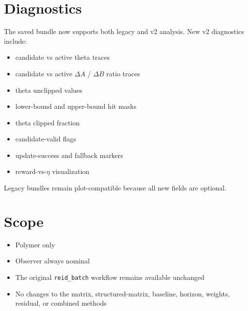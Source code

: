 \documentclass[11pt]{article}
\begin{document}
\section*{Diagnostics}

The saved bundle now supports both legacy and v2 analysis. New v2 diagnostics
include:

\begin{itemize}
\item candidate vs active theta traces
\item candidate vs active $\Delta A$ / $\Delta B$ ratio traces
\item theta unclipped values
\item lower-bound and upper-bound hit masks
\item theta clipped fraction
\item candidate-valid flags
\item update-success and fallback markers
\item reward-vs-$\eta$ visualization
\end{itemize}

Legacy bundles remain plot-compatible because all new fields are optional.

\section*{Scope}

\begin{itemize}
\item Polymer only
\item Observer always nominal
\item The original \texttt{reid\_batch} workflow remains available unchanged
\item No changes to the matrix, structured-matrix, baseline, horizon, weights,
      residual, or combined methods
\end{itemize}
\end{document}
